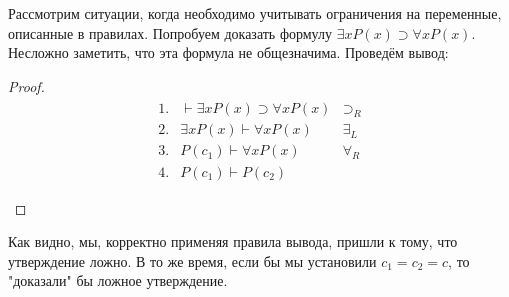 \begin{example}
    Рассмотрим ситуации, когда необходимо учитывать ограничения на переменные, описанные в правилах. Попробуем доказать формулу $\exists x P(x) \supset \forall x P(x)$. Несложно заметить, что эта формула не общезначима. Проведём вывод:

    \begin{proof}
        \begin{equation*}
            \begin{array}{c}
                \begin{array}{llr}
                    1.  & \vdash \exists x P(x) \supset \forall x P(x)
                        & \supset_R
                        \\
                    2.  & \exists x P(x) \vdash \forall x P(x)
                        & \exists_L
                        \\
                    3.  & P(c_1) \vdash \forall x P(x)
                        & \forall_R 
                        \\
                    4.  & P(c_1) \vdash P(c_2)
                        & 
                        \\
                \end{array}
                \\
            \end{array}
        \end{equation*}
    \end{proof}

    Как видно, мы, корректно применяя правила вывода, пришли к тому, что утверждение ложно. В то же время, если бы мы установили $c_1 = c_2 = c$, то "доказали" бы ложное утверждение.
\end{example}

